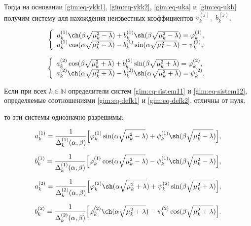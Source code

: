 Тогда на основании \eqref{gim:eq-ykk1}, \eqref{gim:eq-ykk2}, \eqref{gim:eq-uka} и \eqref{gim:eq-ukb} получим систему для нахождения неизвестных коэффициентов $a_k^{(j)},$ $b_k^{(j)}$:

\begin{equation}\left\{\begin{array}{l}a_k^{(1)}\ch(\beta\sqrt{\mu_k^2-\lambda})+b_k^{(1)}\sh(\beta\sqrt{\mu_k^2-\lambda})=\varphi_k^{(1)}, \\

a_k^{(1)}\cos(\alpha\sqrt{\mu_k^2-\lambda})-b_k^{(1)}\sin(\alpha\sqrt{\mu_k^2-\lambda})=\psi_k^{(1)},\end{array}\right.\label{gim:eq-sistem11}

\end{equation}

\begin{equation}\left\{\begin{array}{l}a_k^{(2)}\cos(\beta\sqrt{\mu_k^2+\lambda})+b_k^{(2)}\sin(\beta\sqrt{\mu_k^2+\lambda})=\varphi_k^{(2)}, \\

a_k^{(2)}\ch(\alpha\sqrt{\mu_k^2+\lambda})-b_k^{(2)}\sh(\alpha\sqrt{\mu_k^2+\lambda})=\psi_k^{(2)}.\end{array}\right.\label{gim:eq-sistem12}

\end{equation}



Если при всех $k\in \mathbb{N}$ определители систем \eqref{gim:eq-sistem11} и \eqref{gim:eq-sistem12}, определяемые соотношениями  \eqref{gim:eq-defk1} и \eqref{gim:eq-defk2}, отличны от нуля,

то эти системы однозначно разрешимы:

$$a_k^{(1)}=\frac{1}{\Delta_k^{(1)}(\alpha,\beta)}\Big[\varphi_k^{(1)}\sin(\alpha\sqrt{\mu_k^2-\lambda})+\psi_k^{(1)}\sh(\beta\sqrt{\mu_k^2-\lambda})\Big],$$

$$b_k^{(1)}=\frac{1}{\Delta_k^{(1)}(\alpha,\beta)}\Big[\varphi_k^{(1)}\cos(\alpha\sqrt{\mu_k^2-\lambda})-\psi_k^{(1)}\ch(\beta\sqrt{\mu_k^2-\lambda})\Big],$$

$$a_k^{(2)}=\frac{1}{\Delta_k^{(2)}(\alpha,\beta)}\Big[\varphi_k^{(2)}\sh(\alpha\sqrt{\mu_k^2+\lambda})+\psi_k^{(2)}\sin(\beta\sqrt{\mu_k^2+\lambda})\Big],$$

$$b_k^{(2)}=\frac{1}{\Delta_k^{(2)}(\alpha,\beta)}\Big[\varphi_k^{(2)}\ch(\alpha\sqrt{\mu_k^2+\lambda})-\psi_k^{(2)}\cos(\beta\sqrt{\mu_k^2+\lambda})\Big].$$



